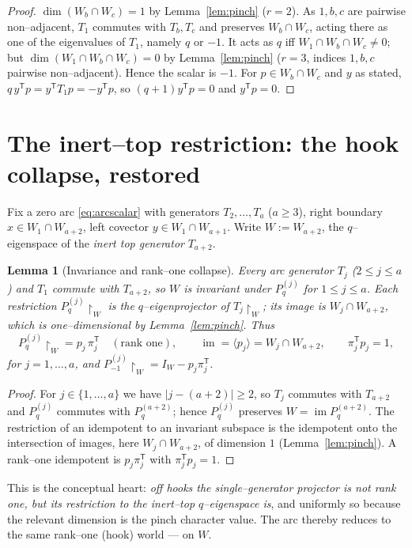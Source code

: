\documentclass[11pt]{article}
\newtheorem{lemma}[theorem]{Lemma}
\theoremstyle{definition}
\DeclareMathOperator{\im}{im}
\newcommand{\Pq}{P_{q}}
\newcommand{\Pm}{P_{-1}}
\newcommand{\W}{W}
\begin{document}
\begin{proof}
$\dim(\W_b\cap\W_c)=1$ by Lemma~\ref{lem:pinch} ($r=2$). As $1,b,c$ are pairwise
non--adjacent, $T_1$ commutes with $T_b,T_c$ and preserves $\W_b\cap\W_c$, acting there as
one of the eigenvalues of $T_1$, namely $q$ or $-1$. It acts as $q$ iff
$\W_1\cap\W_b\cap\W_c\ne0$; but $\dim(\W_1\cap\W_b\cap\W_c)=0$ by Lemma~\ref{lem:pinch}
($r=3$, indices $1,b,c$ pairwise non--adjacent). Hence the scalar is $-1$. For
$p\in\W_b\cap\W_c$ and $y$ as stated, $q\,y^{\mathsf T}p=y^{\mathsf T}T_1p=-y^{\mathsf T}p$, so
$(q+1)y^{\mathsf T}p=0$ and $y^{\mathsf T}p=0$.
\end{proof}

\section{The inert--top restriction: the hook collapse, restored}

Fix a zero arc \eqref{eq:arcscalar} with generators $T_2,\dots,T_a$ ($a\ge3$), right
boundary $x\in\W_1\cap\W_{a+2}$, left covector $y\in\W_1\cap\W_{a+1}$. Write
$\W:=\W_{a+2}$, the $q$--eigenspace of the \emph{inert top generator} $T_{a+2}$.

\begin{lemma}[Invariance and rank--one collapse]\label{lem:collapse}
Every arc generator $T_j$ ($2\le j\le a$) and $T_1$ commute with $T_{a+2}$, so $\W$ is
invariant under $\Pq^{(j)}$ for $1\le j\le a$. Each restriction $\Pq^{(j)}\restriction_\W$
is the $q$--eigenprojector of $T_j\restriction_\W$; its image is $\W_j\cap\W_{a+2}$, which
is one--dimensional by Lemma~\ref{lem:pinch}. Thus
\[
\Pq^{(j)}\restriction_\W=p_j\,\pi_j^{\mathsf T}\quad(\text{rank one}),\qquad
\im=\langle p_j\rangle=\W_j\cap\W_{a+2},\qquad \pi_j^{\mathsf T}p_j=1,
\]
for $j=1,\dots,a$, and $\Pm^{(j)}\restriction_\W=I_\W-p_j\pi_j^{\mathsf T}$.
\end{lemma}

\begin{proof}
For $j\in\{1,\dots,a\}$ we have $|j-(a+2)|\ge2$, so $T_j$ commutes with $T_{a+2}$ and
$\Pq^{(j)}$ commutes with $\Pq^{(a+2)}$; hence $\Pq^{(j)}$ preserves $\W=\im\Pq^{(a+2)}$.
The restriction of an idempotent to an invariant subspace is the idempotent onto the
intersection of images, here $\W_j\cap\W_{a+2}$, of dimension $1$ (Lemma~\ref{lem:pinch}).
A rank--one idempotent is $p_j\pi_j^{\mathsf T}$ with $\pi_j^{\mathsf T}p_j=1$.
\end{proof}

This is the conceptual heart: \emph{off hooks the single--generator projector is not rank
one, but its restriction to the inert--top $q$--eigenspace is}, and uniformly so because
the relevant dimension is the pinch character value. The arc thereby reduces to the same
rank--one (hook) world --- on $\W$.
\end{document}
